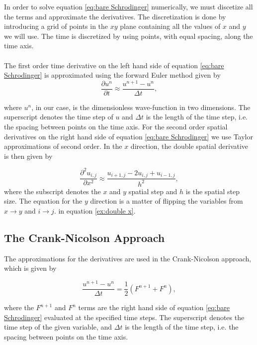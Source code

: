 \documentclass[english,notitlepage,reprint,nofootinbib]{revtex4-2}  %
\begin{document}
	\noindent
	In order to solve equation \ref{eq:bare Schrodinger} numerically, we must discetize all the terms and approximate
	the derivatives. The discretization is done by introducing a grid of points in the
	$xy$ plane containing all the values of $x$ and $y$ we will use. The time is discretized by using points, with equal spacing, along the time axis.\\ \\
	The first order time derivative on the left hand side of equation \ref{eq:bare Schrodinger} is approximated using the forward Euler method given by
	\begin{equation}
		\frac{\partial u^{n}}{\partial t} \approx \frac{u^{n+1}-u^n}{\Delta t},
	\end{equation}

	\noindent
	where $u^n$, in our case, is the dimensionless wave-function in two dimensions.
	The superscript denotes the time step of $u$ and $\Delta t$ is the length of the time
	step, i.e. the spacing between points on the time axis.	For the second order spatial derivatives
	on the right hand side of equation \ref{eq:bare Schrodinger}
	we use Taylor approximations of second order. In the $x$ direction,
	the double spatial derivative is then given by
	
	\begin{equation}\label{ex:double x}
		\frac{\partial^2 u_{i,j}}{\partial x^2} \approx \frac{u_{i+1,j}-2u_{i,j}+u_{i-1,j}}{h^2},
	\end{equation}
	where the subscript denotes the $x$ and $y$ spatial step and $h$ is the spatial step size.
	The equation for the $y$ direction is a matter of flipping the variables from
	$x \rightarrow y$ and $i \rightarrow j$.
	in equation \ref{ex:double x}.
	\subsection{The Crank-Nicolson Approach}
	
	\noindent
	The approximations for the derivatives are used in
	the Crank-Nicolson approach, which is given by
	
	\begin{equation}
		\frac{u^{n+1}-u^{n}}{\Delta t} = \frac{1}{2}    \left(     F^{n+1} + F^n     \right),
	\end{equation}

	\noindent
	where the $F^{n+1}$ and $F^n$ terms are the right hand side of equation \ref{eq:bare Schrodinger}
	evaluated at the specified time steps. The superscript denotes the time step of the given variable, and $\Delta t$ is the length of the time step,
	i.e. the spacing between points on the time axis.\\ \\
\end{document}
